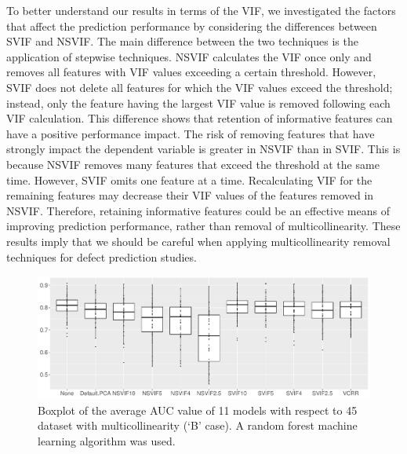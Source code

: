 To better understand our results in terms of the VIF, we investigated the factors that affect the prediction performance by considering the differences between SVIF and NSVIF.
The main difference between the two techniques is the application of stepwise techniques. NSVIF calculates the VIF once only and removes all features with VIF values exceeding a certain threshold. However, SVIF does not delete all features for which the VIF values exceed the threshold; instead, only the feature having the largest VIF value is removed following each VIF calculation. This difference shows that retention of informative features can have a positive performance impact. The risk of removing features that have strongly impact the dependent variable is greater in NSVIF than in SVIF. This is because NSVIF removes many features that exceed the threshold at the same time. However, SVIF omits one feature at a time. Recalculating VIF for the remaining features may decrease their VIF values of the features removed in NSVIF. Therefore, retaining informative features could be an effective means of improving prediction performance, rather than removal of multicollinearity. These results imply that we should be careful when applying multicollinearity removal techniques for defect prediction studies.

\begin{figure}[t]
	\centering
	\includegraphics[width=1\linewidth]{pdfs/RF_1_AUC_5_multicollinearity_with_None_thres_10.0_6_average.csv_boxplot.pdf}
	\caption{Boxplot of the average AUC value of 11 models with respect to 45 dataset with multicollinearity (`B' case). A random forest machine learning algorithm was used.}
	\label{fig:boxplot_RF_AUC_B_case}
\end{figure}

